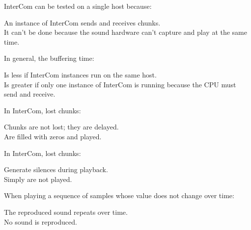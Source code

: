 \documentclass[legalpaper, 12pt, addpoints]{exam}
\begin{document}
\begin{questions}
\vspace{0.10in}

\question InterCom can be tested on a single host because:

\begin{oneparchoices}
  \choice An instance of InterCom sends and receives chunks.\\
  \choice It can't be done because the sound hardware can't capture and play at the same time.
\end{oneparchoices}

\vspace{0.10in}

\question In general, the buffering time:

\begin{oneparchoices}
  \choice Is less if InterCom instances run on the same host.\\
  \choice Is greater if only one instance of InterCom is running because the CPU must send and receive.
\end{oneparchoices}

\vspace{0.10in}

\question In InterCom, lost chunks:

\begin{oneparchoices}
  \choice Chunks are not lost; they are delayed.\\
  \choice Are filled with zeros and played.
\end{oneparchoices}

\vspace{0.10in}

\question In InterCom, lost chunks:

\begin{oneparchoices}
  \choice Generate silences during playback.\\
  \choice Simply are not played.
\end{oneparchoices}

\vspace{0.10in}

\question When playing a sequence of samples whose value does not change over time:

\begin{oneparchoices}
  \choice The reproduced sound repeats over time.\\
  \choice No sound is reproduced.
\end{oneparchoices}

\vspace{0.10in}


\end{questions}
\end{document}
